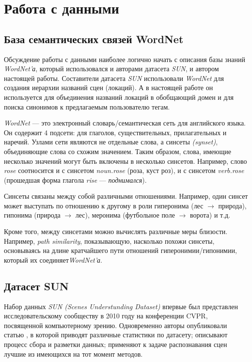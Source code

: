 \section{Работа с данными}


\subsection{База семантических связей WordNet}

\indent
\indent
Обсуждение работы с данными наиболее логично начать с описания базы знаний
\textit{WordNet'а}, который использовался и авторами датасета \textit{SUN},
и автором настоящей работы. Составители датасета \textit{SUN} использовали
\textit{WordNet} для создания иерархии названий сцен (локаций). А в настоящей работе
он используется для объединения названий локаций в обобщающий домен
и для поиска синонимов к предлагаемым пользователю тегам.

\indent
\textit{WordNet} --- это электронный словарь/семантическая сеть для английского
языка. Он содержит 4 подсети: для глаголов, существительных, прилагательных и
наречий. Узлами сети являются не отдельные слова, а синсеты \textit{(synset)},
объединяющие слова со схожим значением. Таким образом, слова, имеющие 
несколько значений могут быть включены в несколько синсетов. Например,
слово \textit{rose} соотносится и с синсетом \textit{noun.rose} (роза, куст роз),
и с синсетом \textit{verb.rose} (прошедшая форма глагола \textit{rise} --- \textit{поднимался}).

Синсеты связаны между собой различными отношениями. 
Например, один синсет может выступать по отношению к другому в 
роли гиперонима (лес $\rightarrow$ природа), 
гипонима (природа $\rightarrow$ лес),
меронима (футбольное поле $\rightarrow$ ворота) и т.д.

Кроме того, между синсетами можно вычислять различные меры близости.
Например, \textit{path similarity}, показывающую, насколько похожи синсеты, 
основываясь на длине кратчайшего пути отношений гиперонимии/гипонимии,
 который их соединяет\textit{WordNet'а}.
    

\subsection{Датасет SUN}

\indent
\indent
Набор данных \textit{SUN (Scenes Understunding Dataset)} впервые был 
представлен исследовательскому сообществу в 2010 году на 
конференции CVPR, посвященной компьютерному зрению. Одновременно
авторы опубликовали статью \cite{sundata}, в которой приводят различные
статистики по датасету; описывают процесс сбора и разметки данных; 
применяют к задаче распознавания сцен лучшие из имеющихся
на тот момент методов. 

